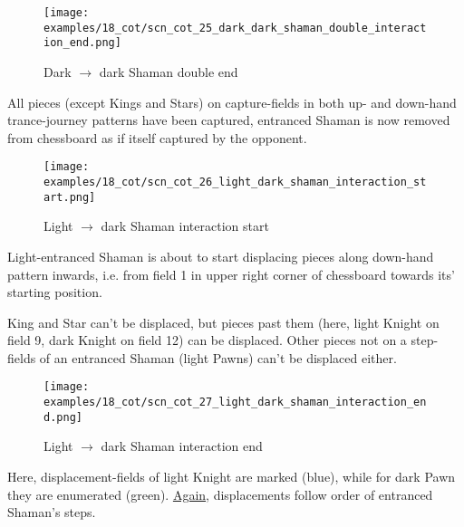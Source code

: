 \noindent
\begin{figure}[!h]
\texttt{[image: examples/18\_cot/scn\_cot\_25\_dark\_dark\_shaman\_double\_interaction\_end.png]}
\caption{Dark $\rightarrow$ dark Shaman double end}
\label{fig:scn_cot_25_dark_dark_shaman_double_interaction_end}
\end{figure}

All pieces (except Kings and Stars) on capture-fields in both up- and down-hand trance-journey
patterns have been captured, entranced Shaman is now removed from chessboard as if itself
captured by the opponent.

\clearpage %

\noindent
\begin{figure}[!h]
\texttt{[image: examples/18\_cot/scn\_cot\_26\_light\_dark\_shaman\_interaction\_start.png]}
\caption{Light $\rightarrow$ dark Shaman interaction start}
\label{fig:scn_cot_26_light_dark_shaman_interaction_start}
\end{figure}

Light-entranced Shaman is about to start displacing pieces along down-hand pattern inwards,
i.e. from field 1 in upper right corner of chessboard towards its' starting position.

King and Star can't be displaced, but pieces past them (here, light Knight on field 9, dark Knight
on field 12) can be displaced. Other pieces not on a step-fields of an entranced Shaman (light
Pawns) can't be displaced either.

\clearpage %

\noindent
\begin{figure}[!h]
\texttt{[image: examples/18\_cot/scn\_cot\_27\_light\_dark\_shaman\_interaction\_end.png]}
\caption{Light $\rightarrow$ dark Shaman interaction end}
\label{fig:scn_cot_27_light_dark_shaman_interaction_end}
\end{figure}

Here, displacement-fields of light Knight are marked (blue), while for dark Pawn they are
enumerated (green). \hyperref[fig:scn_cot_19_light_light_shaman_interaction_end]{Again}, displacements follow order of entranced Shaman's steps.

